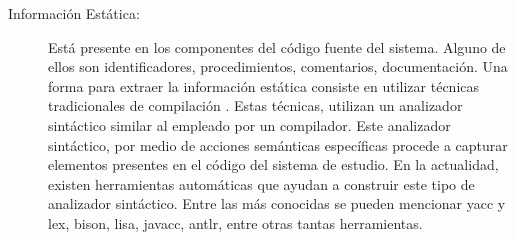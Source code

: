 \begin{description}
\item[Información Estática:] Está presente en los componentes del código fuente del sistema. Alguno de ellos son identificadores, procedimientos, comentarios, documentación.
Una forma para extraer la información estática consiste en utilizar técnicas tradicionales de compilación \cite{AHUL06}. Estas 
técnicas, utilizan un analizador sintáctico similar al empleado por un compilador. Este analizador sintáctico, por medio de acciones semánticas específicas procede a capturar elementos presentes en el código del sistema de estudio. En la actualidad, existen herramientas automáticas que ayudan a construir este tipo de analizador sintáctico. Entre las más conocidas se pueden mencionar yacc y lex, bison, lisa, javacc, antlr, entre otras tantas herramientas.





\end{description}
